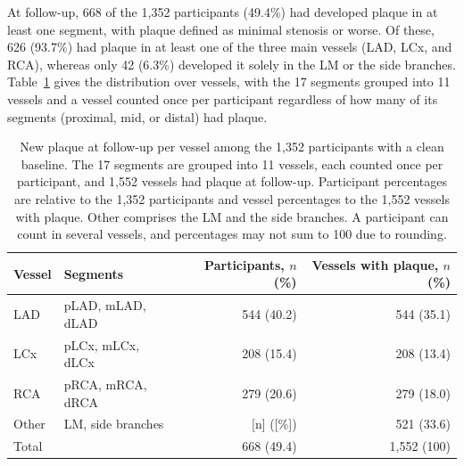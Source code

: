 At follow-up, 668 of the 1,352 participants (49.4\%) had developed plaque in at least one segment, with plaque defined as minimal stenosis or worse.
Of these, 626 (93.7\%) had plaque in at least one of the three main vessels (LAD, LCx, and RCA), whereas only 42 (6.3\%) developed it solely in the LM or the side branches.
Table~\ref{tab:data-plaque-location} gives the distribution over vessels, with the 17 segments grouped into 11 vessels and a vessel counted once per participant regardless of how many of its segments (proximal, mid, or distal) had plaque.

\begin{table}[htbp]
  \centering
  \caption{New plaque at follow-up per vessel among the 1,352 participants with a clean baseline. The 17 segments are grouped into 11 vessels, each counted once per participant, and 1,552 vessels had plaque at follow-up. Participant percentages are relative to the 1,352 participants and vessel percentages to the 1,552 vessels with plaque. Other comprises the LM and the side branches. A participant can count in several vessels, and percentages may not sum to 100 due to rounding.}
  \label{tab:data-plaque-location}
  \small
  \begin{tabular}{llrr}
    \toprule
    Vessel & Segments & Participants, $n$ (\%) & Vessels with plaque, $n$ (\%) \\
    \midrule
    LAD & pLAD, mLAD, dLAD & 544 (40.2) & 544 (35.1) \\
    LCx & pLCx, mLCx, dLCx & 208 (15.4) & 208 (13.4) \\
    RCA & pRCA, mRCA, dRCA & 279 (20.6) & 279 (18.0) \\
    Other & LM, side branches & [n] ([\%]) & 521 (33.6) \\
    \midrule
    Total & & 668 (49.4) & 1,552 (100) \\
    \bottomrule
  \end{tabular}
\end{table}
